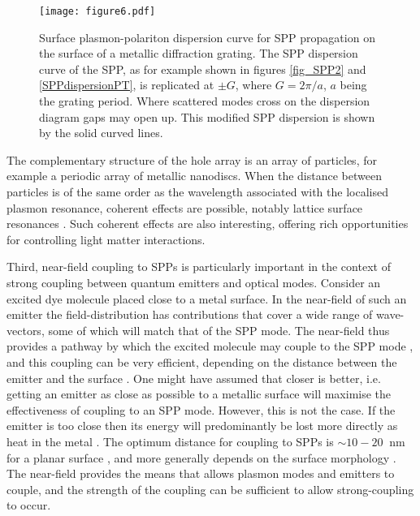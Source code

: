 \documentclass[12pt]{iopart}
\begin{document}
\begin{figure}
\texttt{[image: figure6.pdf]}
\caption{Surface plasmon-polariton dispersion curve for SPP propagation on the surface of a metallic diffraction grating. The SPP dispersion curve of the SPP, as for example shown in figures \ref{fig_SPP2} and \ref{SPPdispersionPT}, is replicated at $\pm G$, where $G=2\pi/a$, $a$ being the grating period. Where scattered modes cross on the dispersion diagram gaps may open up. This modified SPP dispersion is shown by the solid curved lines.} 
\label{fig_SPP3}
\end{figure}

The complementary structure of the hole array is an array of particles, for example a periodic array of metallic nanodiscs. When the distance between particles is of the same order as the wavelength associated with the localised plasmon resonance, coherent effects are possible, notably lattice surface resonances \cite{Zou_JChemPhys_2004_121_12606} \cite{Auguie_PRL_2008_101_143902}. Such coherent effects are also interesting, offering rich opportunities for controlling light matter interactions.


Third, near-field coupling to SPPs is particularly important in the context of strong coupling between quantum emitters and optical modes. Consider an excited dye molecule placed close to a metal surface. In the near-field of such an emitter the field-distribution has contributions that cover a wide range of wave-vectors, some of which will match that of the SPP mode. The near-field thus provides a pathway by which the excited molecule may couple to the SPP mode \cite{Andrew_PRB_2001_64_125405}, and this coupling can be very efficient, depending on the distance between the emitter and the surface \cite{Barnes_JMO_1998_45_661}. One might have assumed that closer is better, i.e. getting an emitter as close as possible to a metallic surface will maximise the effectiveness of coupling to an SPP mode. However, this is not the case. If the emitter is too close then its energy will predominantly be lost more directly as heat in the metal \cite{Barnes_JMO_1998_45_661}. The optimum distance for coupling to SPPs is $\sim 10 - 20\ $ nm for a planar surface \cite {Pockrand_CPL_1980_69_499}, and more generally depends on the surface morphology \cite{Johansson_PRB_2005_72_035427}. The near-field provides the means that allows plasmon modes and emitters to couple, and the strength of the coupling can be sufficient to allow strong-coupling to occur.
\end{document}
